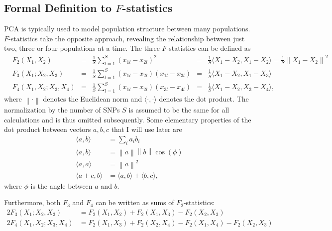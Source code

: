\documentclass[12pt,fullpage, a4paper]{article}
\newcommand{\norm}[1]{\left\lVert#1\right\rVert}
\newcommand{\normsq}[1]{\left\lVert#1\right\rVert^2}
\begin{document}
\subsection{Formal Definition to $F$-statistics}
PCA is typically used to model population structure between many populations. $F$-statistics take the opposite approach, revealing the relationship between just two,  three or four populations at a time. The three $F$-statistics can be defined as 
\begin{subequations}
	\begin{align}
	&F_2(X_1, X_2) &=& \frac{1}{S}\sum_{l=1}^S(x_{1l} - x_{2l})^2
	&=& \frac{1}{S}\langle X_1 - X_2, X_1 - X_2 \rangle = \frac{1}{S}\normsq{X_1-  X_2}\\
	&F_3(X_1; X_2, X_3) &=& \frac{1}{S}\sum_{l=1}^S(x_{1l} - x_{2l})(x_{1l} - x_{3l}) &=& \frac{1}{S}\langle X_1 - X_2, X_1 - X_3 \rangle\\	
	&F_4(X_1, X_2; X_3, X_4) &=& \frac{1}{S}\sum_{l=1}^S(x_{1l} - x_{2l})(x_{3l} - x_{4l}) &=& \frac{1}{S}\langle X_1 - X_2, X_3 - X_4 \rangle	\text{,}
	\end{align}
\end{subequations}
where $\norm{\cdot}$ denotes the Euclidean norm and $\langle \cdot, \cdot \rangle$ denotes the dot product. The normalization by the number of SNPs $S$ is assumed to be the same for all calculations and is thus omitted subsequently. Some elementary properties of the dot product between vectors $a, b, c$ that I will use later are
\begin{subequations}
\begin{align}
\langle a, b \rangle &= \sum_i a_ib_i\\
\langle a, b \rangle &= \norm{a}\norm{b}\cos(\phi)\\
\langle a, a \rangle &= \normsq{a}\\
\langle a + c, b \rangle &= \langle a, b \rangle + \langle b, c \rangle,
\end{align}
\end{subequations}
where $\phi$ is the angle between $a$ and $b$. 

 Furthermore, both $F_3$ and $F_4$ can be written as sums of $F_2$-statistics:
\begin{subequations}
	\begin{align}
2F_3(X_1; X_2, X_3) &=  F_2(X_1, X_2) + F_2(X_1, X_3) - F_2(X_2, X_3)\label{eq:f3fromf2}\\
2F_4(X_1, X_2; X_3, X_4) &= F_2(X_1, X_3) + F_2(X_2, X_4) - F_2(X_1,X_4) - F_2(X_2, X_3)\label{eq:f4fromf2}
	\end{align}
\end{subequations}
\end{document}
